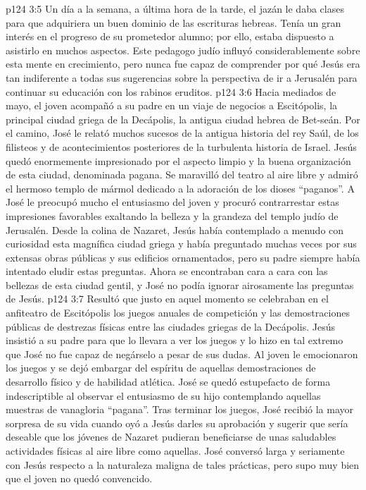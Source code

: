 \vs p124 3:5 Un día a la semana, a última hora de la tarde, el jazán le daba clases para que adquiriera un buen dominio de las escrituras hebreas. Tenía un gran interés en el progreso de su prometedor alumno; por ello, estaba dispuesto a asistirlo en muchos aspectos. Este pedagogo judío influyó considerablemente sobre esta mente en crecimiento, pero nunca fue capaz de comprender por qué Jesús era tan indiferente a todas sus sugerencias sobre la perspectiva de ir a Jerusalén para continuar su educación con los rabinos eruditos.
\vs p124 3:6 \pc Hacia mediados de mayo, el joven acompañó a su padre en un viaje de negocios a Escitópolis, la principal ciudad griega de la Decápolis, la antigua ciudad hebrea de Bet\hyp{}seán. Por el camino, José le relató muchos sucesos de la antigua historia del rey Saúl, de los filisteos y de acontecimientos posteriores de la turbulenta historia de Israel. Jesús quedó enormemente impresionado por el aspecto limpio y la buena organización de esta ciudad, denominada pagana. Se maravilló del teatro al aire libre y admiró el hermoso templo de mármol dedicado a la adoración de los dioses “paganos”. A José le preocupó mucho el entusiasmo del joven y procuró contrarrestar estas impresiones favorables exaltando la belleza y la grandeza del templo judío de Jerusalén. Desde la colina de Nazaret, Jesús había contemplado a menudo con curiosidad esta magnífica ciudad griega y había preguntado muchas veces por sus extensas obras públicas y sus edificios ornamentados, pero su padre siempre había intentado eludir estas preguntas. Ahora se encontraban cara a cara con las bellezas de esta ciudad gentil, y José no podía ignorar airosamente las preguntas de Jesús.
\vs p124 3:7 Resultó que justo en aquel momento se celebraban en el anfiteatro de Escitópolis los juegos anuales de competición y las demostraciones públicas de destrezas físicas entre las ciudades griegas de la Decápolis. Jesús insistió a su padre para que lo llevara a ver los juegos y lo hizo en tal extremo que José no fue capaz de negárselo a pesar de sus dudas. Al joven le emocionaron los juegos y se dejó embargar del espíritu de aquellas demostraciones de desarrollo físico y de habilidad atlética. José se quedó estupefacto de forma indescriptible al observar el entusiasmo de su hijo contemplando aquellas muestras de vanagloria “pagana”. Tras terminar los juegos, José recibió la mayor sorpresa de su vida cuando oyó a Jesús darles su aprobación y sugerir que sería deseable que los jóvenes de Nazaret pudieran beneficiarse de unas saludables actividades físicas al aire libre como aquellas. José conversó larga y seriamente con Jesús respecto a la naturaleza maligna de tales prácticas, pero supo muy bien que el joven no quedó convencido.

